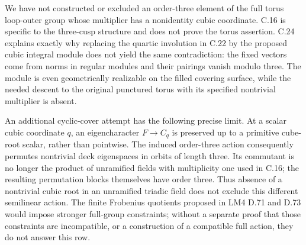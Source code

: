 We have not constructed or excluded an
order-three element of the full torus
loop-outer group whose multiplier has a
nonidentity cubic coordinate.  C.16 is
specific to the three-cusp structure and
does not prove the torus assertion.
C.24 explains exactly why replacing the
quartic involution in C.22 by the proposed
cubic integral module does not yield the
same contradiction: the fixed vectors
come from norms in regular modules and
their pairings vanish modulo three.
The module is even geometrically realizable
on the filled covering surface, while the
needed descent to the original punctured
torus with its specified nontrivial multiplier
is absent.

An additional cyclic-cover attempt has the
following precise limit.  At a scalar cubic
coordinate $q$, an eigencharacter
$F\to C_q$ is preserved up to a primitive
cube-root scalar, rather than pointwise.
The induced order-three action consequently
permutes nontrivial deck eigenspaces in
orbits of length three.  Its commutant is
no longer the product of unramified fields
with multiplicity one used in C.16; the
resulting permutation blocks themselves
have order three.  Thus absence of a
nontrivial cubic root in an unramified
triadic field does not exclude this different
semilinear action.
The finite Frobenius quotients proposed in
LM4 D.71 and D.73 would impose stronger
full-group constraints; without a separate
proof that those constraints are incompatible,
or a construction of a compatible full
action, they do not answer this row.
